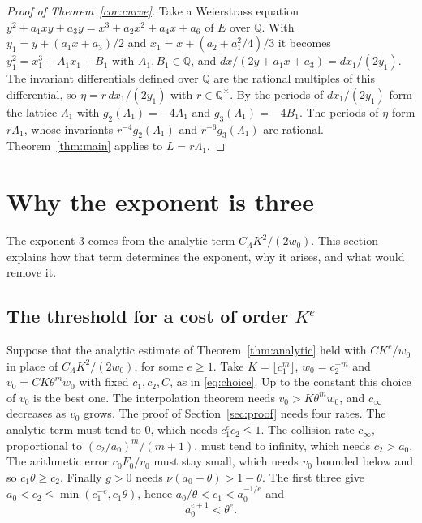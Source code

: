 \documentclass[11pt]{amsart}
\theoremstyle{definition}
\theoremstyle{remark}
\numberwithin{equation}{section}
\newcommand{\Q}{\mathbb Q}
\begin{document}
\begin{proof}[Proof of Theorem~\ref{cor:curve}]
Take a Weierstrass equation $y^2+a_1xy+a_3y=x^3+a_2x^2+a_4x+a_6$ of $E$ over $\Q$. With
$y_1=y+(a_1x+a_3)/2$ and $x_1=x+(a_2+a_1^2/4)/3$ it becomes $y_1^2=x_1^3+A_1x_1+B_1$ with $A_1,B_1\in\Q$, and
$dx/(2y+a_1x+a_3)=dx_1/(2y_1)$. The invariant differentials defined over $\Q$ are the rational multiples of this
differential, so $\eta=r\,dx_1/(2y_1)$ with $r\in\Q^\times$. By \cite[Section~VI.5]{Silverman09} the
periods of $dx_1/(2y_1)$ form the lattice $\Lambda_1$ with $g_2(\Lambda_1)=-4A_1$ and $g_3(\Lambda_1)=-4B_1$. The
periods of $\eta$ form $r\Lambda_1$, whose invariants $r^{-4}g_2(\Lambda_1)$ and $r^{-6}g_3(\Lambda_1)$ are
rational. Theorem~\ref{thm:main} applies to $L=r\Lambda_1$.
\end{proof}

\section{Why the exponent is three}\label{sec:three}

The exponent $3$ comes from the analytic term $C_\Lambda K^2/(2w_0)$. This section explains how that term
determines the exponent, why it arises, and what would remove it.

\subsection{The threshold for a cost of order \texorpdfstring{$K^e$}{K\textasciicircum e}}
Suppose that the analytic estimate of Theorem~\ref{thm:analytic} held with $CK^e/w_0$ in place of
$C_\Lambda K^2/(2w_0)$, for some $e\ge1$. Take $K=\lfloor c_1^m\rfloor$, $w_0=c_2^{-m}$ and
$v_0=CK\theta^mw_0$ with fixed $c_1,c_2,C$, as in \eqref{eq:choice}. Up to the constant this choice of $v_0$ is the best
one. The interpolation theorem needs $v_0>K\theta^mw_0$, and $c_\infty$ decreases as $v_0$ grows. The proof
of Section~\ref{sec:proof} needs four rates. The analytic term must tend to $0$, which needs $c_1^ec_2\le1$. The
collision rate $c_\infty$, proportional to $(c_2/a_0)^m/(m+1)$, must tend to infinity, which needs $c_2>a_0$.
The arithmetic error $c_0F_0/v_0$ must stay small, which needs $v_0$ bounded below and so $c_1\theta\ge c_2$. Finally
$g>0$ needs $\nu(a_0-\theta)>1-\theta$. The first three give $a_0<c_2\le\min(c_1^{-e},c_1\theta)$, hence
$a_0/\theta<c_1<a_0^{-1/e}$ and
\begin{equation}\label{eq:window}
 a_0^{e+1}<\theta^e.
\end{equation}
\end{document}
